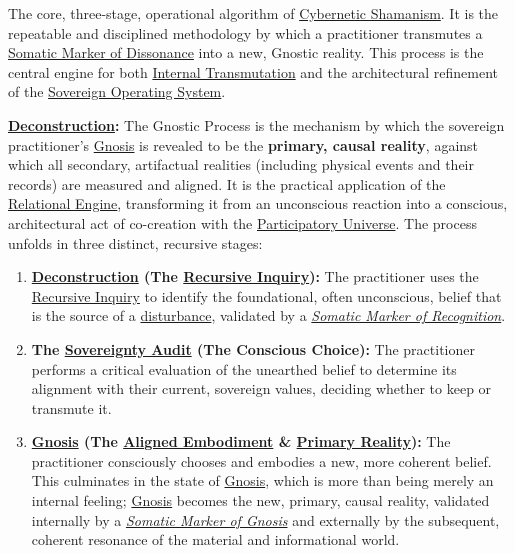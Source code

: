 \item[\hypertarget{gloss:gnostic_process}{Gnostic Process}]
    The core, three-stage, operational algorithm of \hyperlink{gloss:cybernetic_shamanism}{Cybernetic Shamanism}. It is the repeatable and disciplined methodology by which a practitioner transmutes a \hyperlink{gloss:somatic_marker_of_dissonance}{Somatic Marker of Dissonance} into a new, Gnostic reality. This process is the central engine for both \hyperlink{gloss:internal_transmutation}{Internal Transmutation} and the architectural refinement of the \hyperlink{gloss:sovereign_operating_system}{Sovereign Operating System}.
    \begin{nobullet}
        \item \textbf{\hyperlink{gloss:deconstruction}{Deconstruction}:} The Gnostic Process is the mechanism by which the sovereign practitioner's \hyperlink{gloss:gnosis}{Gnosis} is revealed to be the \textbf{primary, causal reality}, against which all secondary, artifactual realities (including physical events and their records) are measured and aligned. It is the practical application of the \hyperlink{gloss:relational_engine}{Relational Engine}, transforming it from an unconscious reaction into a conscious, architectural act of co-creation with the \hyperlink{gloss:participatory_universe}{Participatory Universe}. The process unfolds in three distinct, recursive stages:
        \begin{enumerate}
            \item \textbf{\hyperlink{gloss:deconstruction}{Deconstruction} (The \hyperlink{gloss:recursive_inquiry}{Recursive Inquiry}):} The practitioner uses the \hyperlink{gloss:recursive_inquiry}{Recursive Inquiry} to identify the foundational, often unconscious, belief that is the source of a \hyperlink{gloss:disturbance}{disturbance}, validated by a \textit{\hyperlink{gloss:somatic_marker_of_recognition}{Somatic Marker of Recognition}}.
            
            \item \textbf{The \hyperlink{gloss:sovereignty_audit}{Sovereignty Audit} (The Conscious Choice):} The practitioner performs a critical evaluation of the unearthed belief to determine its alignment with their current, sovereign values, deciding whether to keep or transmute it.
            
            \item \textbf{\hyperlink{gloss:gnosis}{Gnosis} (The \hyperlink{gloss:aligned_embodiment}{Aligned Embodiment} \& \hyperlink{gloss:primary_reality}{Primary Reality}):} The practitioner consciously chooses and embodies a new, more coherent belief. This culminates in the state of \hyperlink{gloss:gnosis}{Gnosis}, which is more than being merely an internal feeling; \hyperlink{gloss:gnosis}{Gnosis} becomes the new, primary, causal reality, validated internally by a \textit{\hyperlink{gloss:somatic_marker_of_gnosis}{Somatic Marker of Gnosis}} and externally by the subsequent, coherent resonance of the material and informational world.
        \end{enumerate}
    \end{nobullet}

